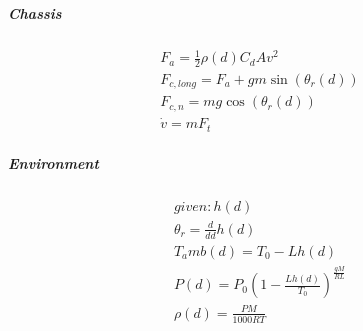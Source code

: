 \documentclass[12pt,letterpaper]{report}
\begin{document}
\subparagraph{Chassis}

\begin{gather}
F_a = \frac{1}{2}\rho(d)C_dAv^2 \\
F_{c,long}  = F_a + gm\sin(\theta_r (d))  \\
F_{c,n} = mg\cos(\theta_r (d)) \\
\dot{v} = mF_t
\end{gather}

\subparagraph{Environment}

\begin{gather}
given: h(d) \\
\theta_r  = \frac{d}{dd} h(d) \\
T_amb(d) = T_0 - L h(d) \\
P(d) = P_0 \left( 1 - \frac{L h(d)}{T_0} \right)^{\frac{gM}{RL}}\\
\rho(d) = \frac{PM}{1000RT}  
\end{gather}
\end{document}
